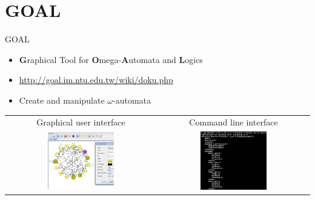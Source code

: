 \documentclass[12pt,handout]{beamer}
\newcommand{\fat}[1]{\textbf{#1}}
\begin{document}
\section{GOAL}
\begin{frame}{GOAL}
\begin{itemize}
\item \fat{G}raphical Tool for \fat{O}mega-\fat{A}utomata and \fat{L}ogics
\item \url{http://goal.im.ntu.edu.tw/wiki/doku.php}
\item Create and manipulate $\omega$-automata
\end{itemize}
\centering
\begin{tabular}{cc}
\footnotesize Graphical user interface & \footnotesize Command line interface \\
\includegraphics[width=0.46\textwidth,trim={0 2cm 0 0},clip]
{figures/goal_gui.png} &
\includegraphics[width=0.46\textwidth,trim={0 2cm 0 0},clip]
{figures/goal_cl.png}
\end{tabular}
\end{frame}
\end{document}
